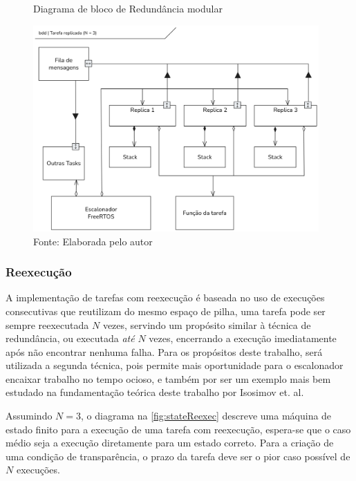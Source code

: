 \begin{figure}[H]
    \centering
    \captionsetup{justification=centering}
    \caption{Diagrama de bloco de Redundância modular}
    \includegraphics[width=0.975\textwidth]{assets/tmr_bdd.png}
    \captionsetup{justification=raggedright}
    \caption*{Fonte: Elaborada pelo autor}
    \label{fig:bddTMR}
\end{figure}

\subsubsection{Reexecução}

A implementação de tarefas com reexecução é baseada no uso de execuções consecutivas que reutilizam do mesmo espaço de pilha, uma tarefa pode ser sempre reexecutada $N$ vezes, servindo um propósito similar à técnica de redundância, ou executada \textit{até} $N$ vezes, encerrando a execução imediatamente após não encontrar nenhuma falha. Para os propósitos deste trabalho, será utilizada a segunda técnica, pois permite mais oportunidade para o escalonador encaixar trabalho no tempo ocioso, e também por ser um exemplo mais bem estudado na fundamentação teórica deste trabalho por Isosimov et. al.

Assumindo $N = 3$, o diagrama na \autoref{fig:stateReexec} descreve uma máquina de estado finito para a execução de uma tarefa com reexecução, espera-se que o caso médio seja a execução diretamente para um estado correto. Para a criação de uma condição de transparência, o prazo da tarefa deve ser o pior caso possível de $N$ execuções.

